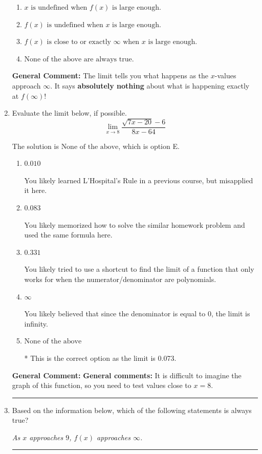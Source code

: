 \documentclass{extbook}[14pt]
\newcommand{\litem}[1]{\item #1

\rule{\textwidth}{0.4pt}}
\begin{document}
\begin{enumerate}
{\begin{enumerate}[label=\Alph*.]
\item \( x \text{ is undefined when } f(x) \text{ is large enough}. \)


\item \( f(x) \text{ is undefined when } x \text{ is large enough}. \)


\item \( f(x) \text{ is close to or exactly } \infty \text{ when } x \text{ is large enough}. \)


\item \( \text{None of the above are always true.} \)


\end{enumerate}

\textbf{General Comment:} The limit tells you what happens as the $x$-values approach $\infty$. It says \textbf{absolutely nothing} about what is happening exactly at $f(\infty)$!
}
\litem{
Evaluate the limit below, if possible.
\[ \lim_{x \rightarrow 8} \frac{\sqrt{7x - 20} - 6}{8x - 64} \]

The solution is \( \text{None of the above} \), which is option E.\begin{enumerate}[label=\Alph*.]
\item \( 0.010 \)

You likely learned L'Hospital's Rule in a previous course, but misapplied it here.
\item \( 0.083 \)

You likely memorized how to solve the similar homework problem and used the same formula here.
\item \( 0.331 \)

You likely tried to use a shortcut to find the limit of a function that only works for when the numerator/denominator are polynomials.
\item \( \infty \)

You likely believed that since the denominator is equal to 0, the limit is infinity.
\item \( \text{None of the above} \)

* This is the correct option as the limit is 0.073.
\end{enumerate}

\textbf{General Comment:} \textbf{General comments:} It is difficult to imagine the graph of this function, so you need to test values close to $x = 8$.
}
\litem{
Based on the information below, which of the following statements is always true?

\begin{center}
    \textit{ As $x$ approaches $9$, $f(x)$ approaches $\infty$. }
\end{center}


}
\end{enumerate}
\end{document}
